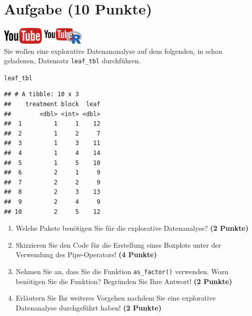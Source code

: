 \documentclass[a4paper, 10pt]{scrartcl}\usepackage[]{graphicx}\usepackage[]{xcolor}
\makeatletter
\newcommand{\hlstd}[1]{\textcolor[rgb]{0.345,0.345,0.345}{#1}}%
\newenvironment{kframe}{%
 \def\at@end@of@kframe{}%
 \ifinner\ifhmode%
  \def\at@end@of@kframe{\end{minipage}}%
  \begin{minipage}{\columnwidth}%
 \fi\fi%
 \def\FrameCommand##1{\hskip\@totalleftmargin \hskip-\fboxsep
 \colorbox{shadecolor}{##1}\hskip-\fboxsep
     \hskip-\linewidth \hskip-\@totalleftmargin \hskip\columnwidth}%
 \MakeFramed {\advance\hsize-\width
   \@totalleftmargin\z@ \linewidth\hsize
   \@setminipage}}%
 {\par\unskip\endMakeFramed%
 \at@end@of@kframe}
\newenvironment{knitrout}{}{} %
\makeatother
\begin{document}
 
\clearpage

\section{Aufgabe \hfill (10 Punkte)}

\hfill\href{https://youtu.be/WIgK_Oj_NW0}{\includegraphics[width =
  2cm]{img/youtube}}
\hspace{2Ex}
\href{https://youtu.be/JCdL7JrZo9o}{\includegraphics[width =
  2cm]{img/youtube_R}}\\[1Ex]


Sie wollen eine explorative Datenananalyse auf dem folgenden, in \Rlogo schon geladenen, Datensatz \texttt{leaf\_tbl} durchf{\"u}hren.



\begin{knitrout}
\color{fgcolor}\begin{kframe}
\begin{alltt}
\hlstd{leaf_tbl}
\end{alltt}
\begin{verbatim}
## # A tibble: 10 x 3
##    treatment block  leaf
##        <dbl> <int> <dbl>
##  1         1     1    12
##  2         1     2     7
##  3         1     3    11
##  4         1     4    14
##  5         1     5    10
##  6         2     1     9
##  7         2     2     9
##  8         2     3    13
##  9         2     4     9
## 10         2     5    12
\end{verbatim}
\end{kframe}
\end{knitrout}

\begin{enumerate}
\item Welche \Rlogo Pakete ben{\"o}tigen Sie f{\"u}r die explorative Datenanalyse?
  \textbf{(2 Punkte)} 
\item Skizzieren Sie den \Rlogo Code f{\"u}r die Erstellung eines
  Boxplots unter der Verwendung des Pipe-Operators! \textbf{(4 Punkte)}
\item Nehmen Sie an, dass Sie die Funktion \texttt{as\_factor()}
  verwenden. Wozu ben{\"o}tigen Sie die Funktion? Begr{\"u}nden Sie Ihre Antwort!
  \textbf{(2 Punkte)}
\item Erl{\"a}utern Sie Ihr weiteres Vorgehen nachdem Sie eine explorative
  Datenanalyse durchgef{\"u}hrt haben! \textbf{(2 Punkte)}
\end{enumerate}
\end{document}
